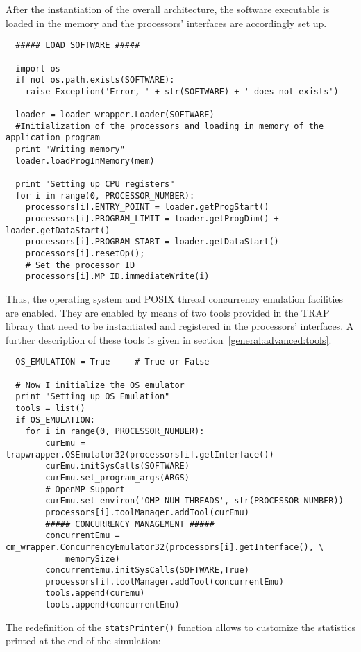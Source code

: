 \indent After the instantiation of the overall architecture, the software executable is loaded in the memory and the processors' interfaces are accordingly set up.

\scriptsize
\begin{verbatim}
  ##### LOAD SOFTWARE #####

  import os
  if not os.path.exists(SOFTWARE):
    raise Exception('Error, ' + str(SOFTWARE) + ' does not exists')

  loader = loader_wrapper.Loader(SOFTWARE)
  #Initialization of the processors and loading in memory of the application program
  print "Writing memory"
  loader.loadProgInMemory(mem)

  print "Setting up CPU registers"
  for i in range(0, PROCESSOR_NUMBER):
    processors[i].ENTRY_POINT = loader.getProgStart()
    processors[i].PROGRAM_LIMIT = loader.getProgDim() + loader.getDataStart()
    processors[i].PROGRAM_START = loader.getDataStart()
    processors[i].resetOp();
    # Set the processor ID
    processors[i].MP_ID.immediateWrite(i)
\end{verbatim}
\normalsize

\indent Thus, the operating system and POSIX thread concurrency emulation facilities are enabled. They are enabled by means of two tools provided in the TRAP library that need to be instantiated and registered in the processors' interfaces. A further description of these tools is given in section~\ref{general:advanced:tools}.

\scriptsize
\begin{verbatim}
  OS_EMULATION = True     # True or False

  # Now I initialize the OS emulator
  print "Setting up OS Emulation"
  tools = list()
  if OS_EMULATION:
    for i in range(0, PROCESSOR_NUMBER):
        curEmu = trapwrapper.OSEmulator32(processors[i].getInterface())
        curEmu.initSysCalls(SOFTWARE)
        curEmu.set_program_args(ARGS)
        # OpenMP Support
        curEmu.set_environ('OMP_NUM_THREADS', str(PROCESSOR_NUMBER)) 
        processors[i].toolManager.addTool(curEmu)
        ##### CONCURRENCY MANAGEMENT #####
        concurrentEmu = cm_wrapper.ConcurrencyEmulator32(processors[i].getInterface(), \
            memorySize)
        concurrentEmu.initSysCalls(SOFTWARE,True)
        processors[i].toolManager.addTool(concurrentEmu)
        tools.append(curEmu)
        tools.append(concurrentEmu)
\end{verbatim}
\normalsize

\indent The redefinition of the \texttt{statsPrinter()} function allows to customize the statistics printed at the end of the simulation:

